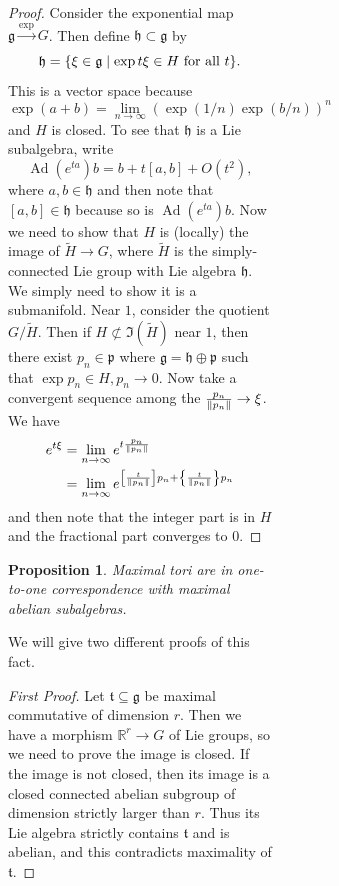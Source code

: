 \documentclass[leqno, openany]{memoir}
\newtheorem{prop}[thm]{Proposition}
\theoremstyle{definition}
\theoremstyle{remark}
\theoremstyle{plain}
\theoremstyle{definition}
\theoremstyle{remark}
\newcommand{\R}{\mathbb{R}}
\newcommand{\mf}[1]{\mathfrak{#1}}
\newcommand{\wtl}[1]{\widetilde{#1}}
\DeclareMathOperator{\Ad}{Ad}
\begin{document}
\begin{figure}[H]
\begin{figure}[H]
\begin{figure}[H]
\begin{proof} Consider the exponential map $\mf{g} \xrightarrow{\exp} G$. Then
    define $\mf{h} \subset \mf{g}$ by \[ \mf{h} = \qty{ \xi \in \mf{g} \mid
        \exp t \xi \in H \text{~for all } t }. \] This is a vector space
        because \[ \exp(a+b) = \lim_{n \to \infty} {(\exp(1/n) \exp(b/n))}^n \]
        and $H$ is closed. To see that $\mf{h}$ is a Lie subalgebra, write \[
        \Ad(e^{t a}) b = b + t[a,b] + O(t^2), \] where $a,b \in \mf{h}$ and
        then note that $[a,b] \in \mf{h}$ because so is $\Ad(e^{ta})b$. Now we
        need to show that $H$ is (locally) the image of $\wtl{H} \to G$, where
        $\wtl{H}$ is the simply-connected Lie group with Lie algebra $\mf{h}$.
        We simply need to show it is a submanifold. Near $1$, consider the
        quotient $G / \wtl{H}$. Then if $H \not\subset \Im(\wtl{H})$ near $1$,
        then there exist $p_n \in \mf{p}$ where $\mf{g} = \mf{h} \oplus \mf{p}$
        such that $\exp p_n \in H, p_n \to 0$. Now take a convergent sequence
        among the $\frac{p_n}{\norm{p_n}} \to \xi$. We have \begin{align*} e^{t
        \xi} &= \lim_{n \to \infty} e^{t \frac{p_n}{\norm{p_n}}} \\ &= \lim_{n
\to \infty} e^{\qty[\frac{t}{\norm{p_n}}] p_n + \qty{ \frac{t}{\norm{p_n}}} p_n
} \end{align*} and then note that the integer part is in $H$ and the fractional
part converges to $0$.  \end{proof}

\begin{prop} Maximal tori are in one-to-one correspondence with maximal abelian
subalgebras.  \end{prop}

We will give two different proofs of this fact.

\begin{proof}[First Proof] Let $\mf{t} \subseteq \mf{g}$ be maximal commutative
    of dimension $r$. Then we have a morphism $\R^r \to G$ of Lie groups, so we
    need to prove the image is closed. If the image is not closed, then its
    image is a closed connected abelian subgroup of dimension strictly larger
    than $r$. Thus its Lie algebra strictly contains $\mf{t}$ and is abelian,
    and this contradicts maximality of $\mf{t}$.  \end{proof}


\end{figure}
\end{figure}
\end{figure}
\end{document}
